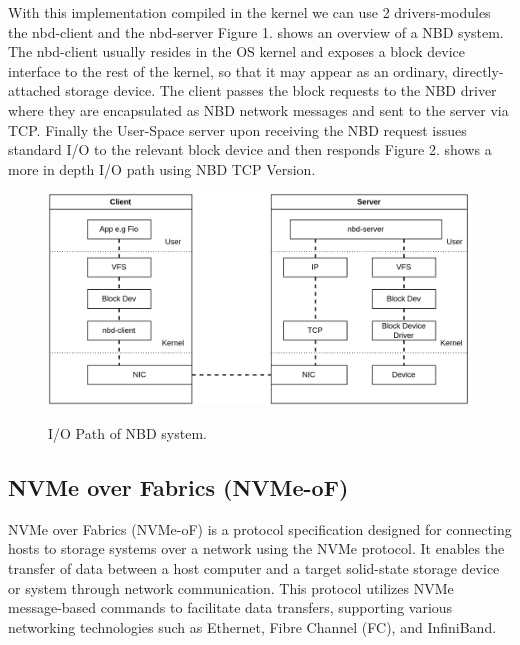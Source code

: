 With this implementation compiled in the kernel we can use 2 drivers-modules the nbd-client and the nbd-server Figure 1. shows an overview of a NBD system. The nbd-client usually resides in the OS kernel and exposes a block device interface to the rest of the kernel, so that it may appear as an ordinary, directly-attached storage device. The client passes the block requests to the NBD driver where they are encapsulated as NBD network messages and sent to the server via TCP. Finally the User-Space server upon receiving the NBD request issues standard I/O to the relevant block device and then responds Figure 2. shows a more in depth I/O path using NBD TCP Version. 

  \begin{figure}[h]
    \includegraphics[scale=0.25]{figures/nbd-path2.png}\\
    \caption{I/O Path of NBD system.}
  \end{figure}

\vspace{1em}
\subsection{NVMe over Fabrics (NVMe-oF)}
NVMe over Fabrics (NVMe-oF) is a protocol specification designed for connecting
hosts to storage systems over a network using the NVMe protocol. It enables the
transfer of data between a host computer and a target solid-state storage device
or system through network communication. This protocol utilizes NVMe
message-based commands to facilitate data transfers, supporting various
networking technologies such as Ethernet, Fibre Channel (FC), and InfiniBand.

\vspace{1em}
